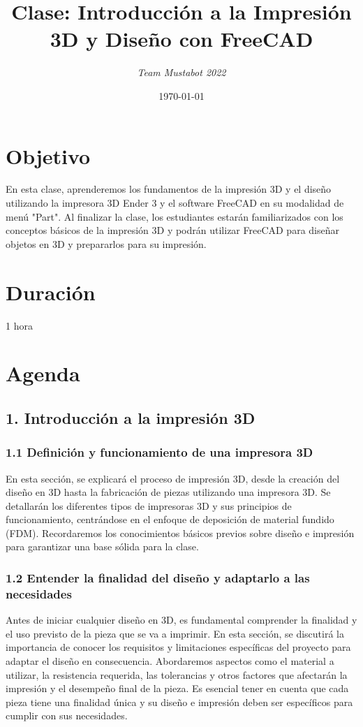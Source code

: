\documentclass{article}
\title{\textbf{Clase: Introducción a la Impresión 3D y Diseño con FreeCAD}}
\author{\textit{Team Mustabot 2022}}
\date{\today}
\begin{document}
\maketitle

\section*{Objetivo}
En esta clase, aprenderemos los fundamentos de la impresión 3D y el diseño utilizando la impresora 3D Ender 3 y el software FreeCAD en su modalidad de menú "Part". Al finalizar la clase, los estudiantes estarán familiarizados con los conceptos básicos de la impresión 3D y podrán utilizar FreeCAD para diseñar objetos en 3D y prepararlos para su impresión.

\section*{Duración}
1 hora

\section*{Agenda}
\subsection*{1. Introducción a la impresión 3D}
\subsubsection*{1.1 Definición y funcionamiento de una impresora 3D}
En esta sección, se explicará el proceso de impresión 3D, desde la creación del diseño en 3D hasta la fabricación de piezas utilizando una impresora 3D. Se detallarán los diferentes tipos de impresoras 3D y sus principios de funcionamiento, centrándose en el enfoque de deposición de material fundido (FDM). Recordaremos los conocimientos básicos previos sobre diseño e impresión para garantizar una base sólida para la clase.

\subsubsection*{1.2 Entender la finalidad del diseño y adaptarlo a las necesidades}
Antes de iniciar cualquier diseño en 3D, es fundamental comprender la finalidad y el uso previsto de la pieza que se va a imprimir. En esta sección, se discutirá la importancia de conocer los requisitos y limitaciones específicas del proyecto para adaptar el diseño en consecuencia. Abordaremos aspectos como el material a utilizar, la resistencia requerida, las tolerancias y otros factores que afectarán la impresión y el desempeño final de la pieza. Es esencial tener en cuenta que cada pieza tiene una finalidad única y su diseño e impresión deben ser específicos para cumplir con sus necesidades.
\end{document}
